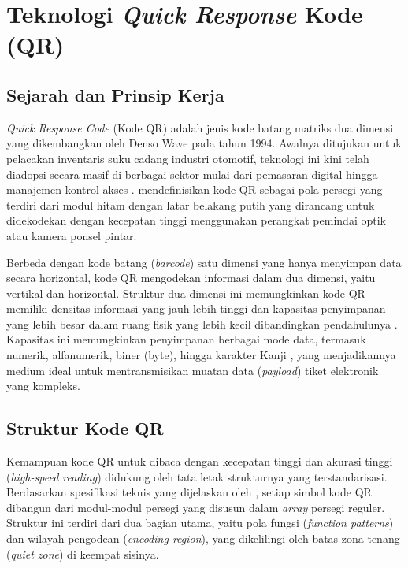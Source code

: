 \section{Teknologi \textit{Quick Response} Kode (QR)}
\label{sec:qrcode}

\subsection{Sejarah dan Prinsip Kerja}
\textit{Quick Response Code} (Kode QR) adalah jenis kode batang matriks dua dimensi yang dikembangkan oleh Denso Wave pada tahun 1994. Awalnya ditujukan untuk pelacakan inventaris suku cadang industri otomotif, teknologi ini kini telah diadopsi secara masif di berbagai sektor mulai dari pemasaran digital hingga manajemen kontrol akses \cite{tiwari2016introduction, shin2012psychology}. \textcite{shin2012psychology} mendefinisikan kode QR sebagai pola persegi yang terdiri dari modul hitam dengan latar belakang putih yang dirancang untuk didekodekan dengan kecepatan tinggi menggunakan perangkat pemindai optik atau kamera ponsel pintar.

Berbeda dengan kode batang (\textit{barcode}) satu dimensi yang hanya menyimpan data secara horizontal, kode QR mengodekan informasi dalam dua dimensi, yaitu vertikal dan horizontal. Struktur dua dimensi ini memungkinkan kode QR memiliki densitas informasi yang jauh lebih tinggi dan kapasitas penyimpanan yang lebih besar dalam ruang fisik yang lebih kecil dibandingkan pendahulunya \cite{alsuhibany2025innovative}. Kapasitas ini memungkinkan penyimpanan berbagai mode data, termasuk numerik, alfanumerik, biner (byte), hingga karakter Kanji \cite{tiwari2016introduction}, yang menjadikannya medium ideal untuk mentransmisikan muatan data (\textit{payload}) tiket elektronik yang kompleks.

\subsection{Struktur Kode QR}
Kemampuan kode QR untuk dibaca dengan kecepatan tinggi dan akurasi tinggi (\textit{high-speed reading}) didukung oleh tata letak strukturnya yang terstandarisasi. Berdasarkan spesifikasi teknis yang dijelaskan oleh \textcite{tiwari2016introduction}, setiap simbol kode QR dibangun dari modul-modul persegi yang disusun dalam \textit{array} persegi reguler. Struktur ini terdiri dari dua bagian utama, yaitu pola fungsi (\textit{function patterns}) dan wilayah pengodean (\textit{encoding region}), yang dikelilingi oleh batas zona tenang (\textit{quiet zone}) di keempat sisinya.

